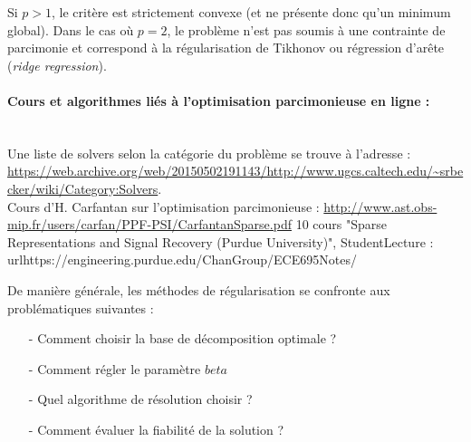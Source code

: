 Si $p>1$, le critère est strictement convexe (et ne présente donc qu'un minimum global). Dans le cas où $p=2$, le problème n'est pas soumis à une contrainte de parcimonie et correspond à la régularisation de Tikhonov ou régression d'arête (\textit{ridge regression}).


\paragraph{Cours et algorithmes liés à l'optimisation parcimonieuse en ligne :}~\\
Une liste de solvers selon la catégorie du problème se trouve à l'adresse : \url{https://web.archive.org/web/20150502191143/http://www.ugcs.caltech.edu/~srbecker/wiki/Category:Solvers}.\\
Cours d'H. Carfantan sur l'optimisation parcimonieuse : \url{http://www.ast.obs-mip.fr/users/carfan/PPF-PSI/CarfantanSparse.pdf}
10 cours  "Sparse Representations and Signal Recovery (Purdue University)", StudentLecture : url{https://engineering.purdue.edu/ChanGroup/ECE695Notes/}



De manière générale, les méthodes de régularisation se confronte aux problématiques suivantes : 
\begin{itemize}
	\item[-] Comment choisir la base de décomposition optimale ?
	\item[-] Comment régler le paramètre $beta$
	\item[-] Quel algorithme de résolution choisir ?
	\item[-] Comment évaluer la fiabilité de la solution ?
\end{itemize}





